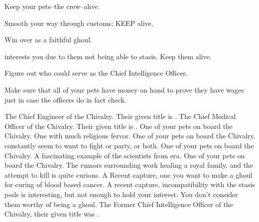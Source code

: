 \documentclass[char]{guildcamp4}
\begin{document}
 

\begin{itemz}[Goals]
	\item Keep your pets--the crew--alive.
	\item Smooth your way through customs; KEEP \cCbad{} alive.
	\item Win over \cSpite{} as a faithful ghoul.
	\item \cPlead{} interests you due to them not being able to stasis. Keep them alive. 
	\item Figure out who could serve as the Chief Intelligence Officer.
	\item Make sure that all of your pets have money on hand to prove they have wages just in case the officers do in fact check.

\end{itemz}

\begin{contacts}
	\contact{\cVtwo{}} The Chief Engineer of the Chivalry. Their given title is \cVtwo{\Marq}.
	\contact{\cVthree{}} The Chief Medical Officer of the Chivalry. Their given title is \cVtwo{\Baron}.
	\contact{\cJoan{}} One of your pets on board the Chivalry. One with much religious fervor.
	\contact{\cJulie{}} One of your pets on board the Chivalry. \cJulie{\they} constantly seem to want to fight or party, or both.
	\contact{\cJames{}} One of your pets on board the Chivalry. A fascinating example of the scientists from \cJames{\their} era.
	\contact{\cRasputin{}} One of your pets on board the Chivalry. The rumors surrounding \cRasputin{\their} work healing a royal family, and the attempt to kill \cRasputin{\them} is quite curious.
	\contact{\cSpite{}} A Recent capture, one you want to make a ghoul for \cSpite{\their} curing of blood based cancer.
	\contact{\cPlead{}} A recent capture,  incompatibility with the stasis pods is interesting, but not enough to hold your interest. You don't consider them worthy of being a ghoul.
	\contact{\cIntel{}} The Former Chief Intelligence Officer of the Chivalry, their given title was \cIntel{\Count}.
\end{contacts}
\end{document}

